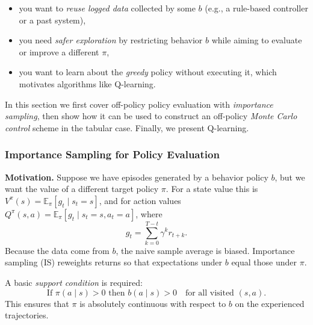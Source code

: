 \documentclass[
]{book}
\theoremstyle{definition}
\theoremstyle{definition}
\theoremstyle{definition}
\theoremstyle{definition}
\theoremstyle{remark}
\begin{document}
\begin{itemize}
\item
  you want to \emph{reuse logged data} collected by some \(b\) (e.g., a rule-based controller or a past system),
\item
  you need \emph{safer exploration} by restricting behavior \(b\) while aiming to evaluate or improve a different \(\pi\),
\item
  you want to learn about the \emph{greedy} policy without executing it, which motivates algorithms like Q-learning.
\end{itemize}

In this section we first cover off-policy policy evaluation with \emph{importance sampling}, then show how it can be used to construct an off-policy \emph{Monte Carlo control} scheme in the tabular case. Finally, we present Q-learning.

\subsubsection{Importance Sampling for Policy Evaluation}\label{importance-sampling-for-policy-evaluation}

\textbf{Motivation.} Suppose we have episodes generated by a behavior policy \(b\), but we want the value of a different target policy \(\pi\). For a state value this is \(V^\pi(s) = \mathbb{E}_\pi[g_t \mid s_t=s]\), and for action values \(Q^\pi(s,a) = \mathbb{E}_\pi[g_t \mid s_t=s, a_t=a]\), where
\[
g_t = \sum_{k=0}^{T-t} \gamma^{k} r_{t+k}.
\]
Because the data come from \(b\), the naive sample average is biased. Importance sampling (IS) reweights returns so that expectations under \(b\) equal those under \(\pi\).

A basic \emph{support condition} is required:
\begin{equation}
\text{If } \pi(a\mid s) > 0 \text{ then } b(a\mid s) > 0 \quad \text{for all visited } (s,a).
\label{eq:IS-SupportCondition}
\end{equation}
This ensures that \(\pi\) is absolutely continuous with respect to \(b\) on the experienced trajectories.
\end{document}
